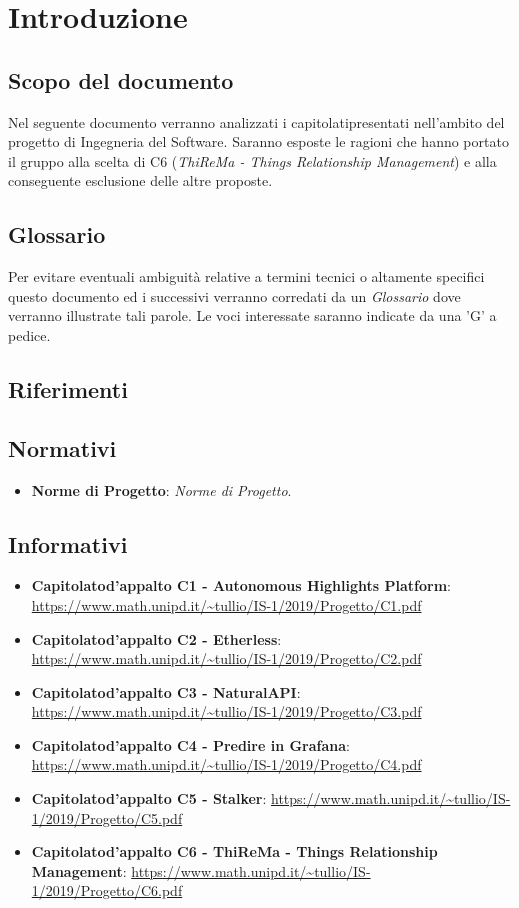 \section{Introduzione}
    \subsection{Scopo del documento}
        Nel seguente documento verranno analizzati i capitolati\glo presentati nell'ambito del progetto di Ingegneria del Software. Saranno
        esposte le ragioni che hanno portato il gruppo alla scelta di C6 (\textit{ThiReMa - Things Relationship Management}) e
        alla conseguente esclusione delle altre proposte.
    \subsection{Glossario}
        Per evitare eventuali ambiguità relative a termini tecnici o altamente specifici questo documento ed i successivi verranno
        corredati da un \textit{Glossario} dove verranno illustrate tali parole. Le voci interessate saranno indicate da una 'G' a
        pedice.
    \subsection{Riferimenti}
        \subsection{Normativi}
            \begin{itemize}
                \item \textbf{Norme di Progetto}: \textit{Norme di Progetto}.
            \end{itemize}
        \subsection{Informativi}
            \begin{itemize}
                \item \textbf{Capitolato\glo d'appalto C1 - Autonomous Highlights Platform}: \url{https://www.math.unipd.it/~tullio/IS-1/2019/Progetto/C1.pdf}
                \item \textbf{Capitolato\glo d'appalto C2 - Etherless}: \url{https://www.math.unipd.it/~tullio/IS-1/2019/Progetto/C2.pdf}
                \item \textbf{Capitolato\glo d'appalto C3 - NaturalAPI}: \url{https://www.math.unipd.it/~tullio/IS-1/2019/Progetto/C3.pdf}
                \item \textbf{Capitolato\glo d'appalto C4 - Predire in Grafana}: \url{https://www.math.unipd.it/~tullio/IS-1/2019/Progetto/C4.pdf}
                \item \textbf{Capitolato\glo d'appalto C5 - Stalker}: \url{https://www.math.unipd.it/~tullio/IS-1/2019/Progetto/C5.pdf}
                \item \textbf{Capitolato\glo d'appalto C6 - ThiReMa - Things Relationship Management}: \url{https://www.math.unipd.it/~tullio/IS-1/2019/Progetto/C6.pdf}
            \end{itemize}
